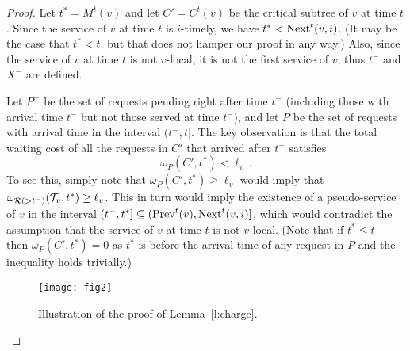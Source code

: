 \documentclass[a4paper]{article}
\newcommand{\calR}{{\cal R}}
\newcommand{\calT}{{\cal T}}
\newcommand{\length}{\ell}
\newcommand{\vertmaturity}{M}
\newcommand{\prv}[2]{\mbox{\rm Prev}^#1(#2)}
\newcommand{\nxt}[3]{\mbox{\rm Next}^#1(#2,#3)}
\newcommand{\matvt}{{t^\ast}}
\begin{document}
\begin{proof}
Let $\matvt =\vertmaturity^t(v)$ and let $C'=C^t(v)$ be the 
critical subtree of $v$ at time $t$.
Since the service of $v$ at time $t$ is $i$-timely, we have $\matvt <\nxt{t}{v}{i}$.
(It may be the case that $\matvt <t$, but that does not
hamper our proof in any way.)
Also, since the service of $v$ at time $t$ is not $v$-local,
 it is not the first service of $v$, thus $t^-$ and
$X^-$ are defined.  

Let $P^-$ be the set of requests pending right after
time $t^-$ (including those with arrival time $t^-$ but not those
served at time $t^-$), and let $P$ be the set of requests 
with arrival time in the interval $(t^-,t]$.
The key observation is that the total waiting cost of all the requests
in $C'$ that arrived after $t^-$ satisfies
\begin{equation}
\label{eq:new}  
\omega_P(C',\matvt)<\length_v\,.
\end{equation}
To see this, simply note that $\omega_P(C',\matvt)\geq \length_v$
would imply that $\omega_{\calR(>t^-)} (\calT_v,\matvt)\geq \length_v$.
This in turn would
imply the existence of a pseudo-service of $v$ in the interval
$(t^-,\matvt]\subseteq (\prv{t}{v},\nxt{t}{v}{i}]$, which would
contradict the assumption that the service of $v$ at time $t$
is not $v$-local. (Note that if $\matvt \leq t^-$ then $\omega_P(C',\matvt)=0$
as $\matvt$ is before the arrival time of any request in $P$ and the
inequality holds trivially.)



\begin{figure}
\begin{center}
\texttt{[image: fig2]}
\caption{Illustration of the proof of Lemma~\ref{l:charge}.}
\label{fig: online mlap analysis}
\end{center}
\end{figure}



\end{proof}
\end{document}
